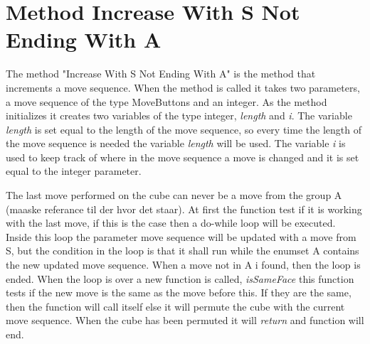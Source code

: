 \section{Method Increase With S Not Ending With A}

The method "Increase With S Not Ending With A" is the method that increments a move sequence. When the method is called it takes two parameters, a move sequence of the type MoveButtons and an integer. As the method initializes it creates two variables of the type integer, \textit{length} and \textit{i}. The variable \textit{length} is set equal to the length of the move sequence, so every time the length of the move sequence is needed the variable \textit{length} will be used. The variable \textit{i} is used to keep track of where in the move sequence a move is changed and it is set equal to the integer parameter. 

The last move performed on the cube can never be a move from the group A (maaske referance til der hvor det staar). At first the function test if it is working with the last move, if this is the case then a do-while loop will be executed. Inside this loop the parameter move sequence will be updated with a move from S, but the condition in the loop is that it shall run while the enumset A contains the new updated move sequence. When a move not in A i found, then the loop is ended.
When the loop is over a new function is called, \textit{isSameFace} this function tests if the new move is the same as the move before this. If they are the same, then the function will call itself else it will permute the cube with the current move sequence. When the cube has been permuted it will \textit{return} and function will end.




